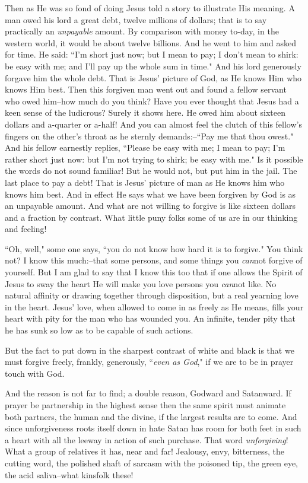 Then as He was so fond of doing Jesus told a story to illustrate His
meaning. A man owed his lord a great debt, twelve millions of dollars;
that is to say practically an \textit{unpayable} amount. By comparison with money
to-day, in the western world, it would be about twelve billions. And he
went to him and asked for time. He said: ``I'm short just now; but I mean
to pay; I don't mean to shirk: be easy with me; and I'll pay up the whole
sum in time." And his lord generously forgave him the whole debt. That is
Jesus' picture of God, as He knows Him who knows Him best. Then this
forgiven man went out and found a fellow servant who owed him--how much do
you think? Have you ever thought that Jesus had a keen sense of the
ludicrous? Surely it shows here. He owed him about sixteen dollars and
a-quarter or a-half! And you can almost feel the clutch of this fellow's
fingers on the other's throat as he sternly demands:--``Pay me that thou
owest." And his fellow earnestly replies, ``Please be easy with me; I mean
to pay; I'm rather short just now: but I'm not trying to shirk; be easy
with me." Is it possible the words do not sound familiar! But he would
not, but put him in the jail. The last place to pay a debt! That is Jesus'
picture of man as He knows him who knows him best. And in effect He says
what we have been forgiven by God is as an unpayable amount. And what are
not willing to forgive is like sixteen dollars and a fraction by contrast.
What little puny folks some of us are in our thinking and feeling!

``Oh, well," some one says, ``you do not know how hard it is to forgive."
You think not? I know this much:--that some persons, and some things you
\textit{can}not forgive of yourself. But I am glad to say that I know this too
that if one allows the Spirit of Jesus to sway the heart He will make you
love persons you \textit{can}not like. No natural affinity or drawing together
through disposition, but a real yearning love in the heart. Jesus' love,
when allowed to come in as freely as He means, fills your heart with pity
for the man who has wounded you. An infinite, tender pity that he has sunk
so low as to be capable of such actions.

But the fact to put down in the sharpest contrast of white and black is
that we must forgive freely, frankly, generously, ``\textit{even as God}," if we
are to be in prayer touch with God.

And the reason is not far to find; a double reason, Godward and Satanward.
If prayer be partnership in the highest sense then the same spirit must
animate both partners, the human and the divine, if the largest results
are to come. And since unforgiveness roots itself down in hate Satan has
room for both feet in such a heart with all the leeway in action of such
purchase. That word \textit{unforgiving}! What a group of relatives it has, near
and far! Jealousy, envy, bitterness, the cutting word, the polished shaft
of sarcasm with the poisoned tip, the green eye, the acid saliva--what
kinsfolk these!



